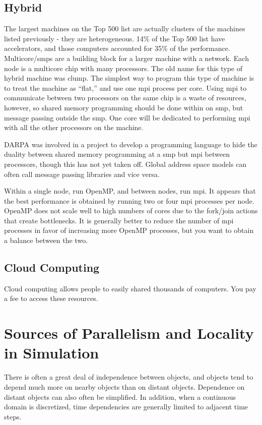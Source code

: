 \documentclass[10pt]{article}
\begin{document}
\begin{flushleft}
\subsection{Hybrid}

The largest machines on the Top 500 list are actually clusters of the machines listed previously - they are heterogeneous. 14\% of the Top 500 list have accelerators, and those computers accounted for 35\% of the performance. Multicore/\gls{smp}s are a building block for a larger machine with a network. Each node is a multicore chip with many processors. The old name for this type of hybrid machine was \gls{clump}. The simplest way to program this type of machine is to treat the machine as ``flat,'' and use one \gls{mpi} process per core. Using \gls{mpi} to communicate between two processors on the same chip is a waste of resources, however, so shared memory programming should be done within on \gls{smp}, but message passing outside the \gls{smp}. One core will be dedicated to performing \gls{mpi} with all the other processors on the machine. 

DARPA was involved in a project to develop a programming language to hide the duality between shared memory programming at a \gls{smp} but \gls{mpi} between processors, though this has not yet taken off. Global address space models can often call message passing libraries and vice versa. 

Within a single node, run OpenMP, and between nodes, run \gls{mpi}. It appears that the best performance is obtained by running two or four \gls{mpi} processes per node. OpenMP does not scale well to high numbers of cores due to the fork/join actions that create bottlenecks. It is generally better to reduce the number of \gls{mpi} processes in favor of increasing more OpenMP processes, but you want to obtain a balance between the two.

\subsection{Cloud Computing}

Cloud computing allows people to easily shared thousands of computers. You pay a fee to access these resources.

\section{Sources of Parallelism and Locality in Simulation}

There is often a great deal of independence between objects, and objects tend to depend much more on nearby objects than on distant objects. Dependence on distant objects can also often be simplified. In addition, when a continuous domain is discretized, time dependencies are generally limited to adjacent time steps. 


\end{flushleft}
\end{document}
